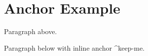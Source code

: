 \section{Anchor Example}\label{anchor-example}

Paragraph above.

Paragraph below with inline anchor \^{}keep-me.

